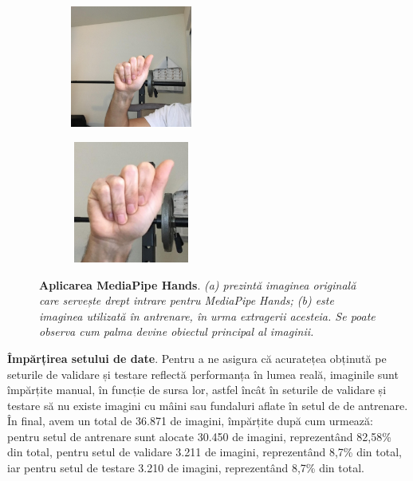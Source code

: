 \begin{figure}[H]
  \centering
  \begin{subfigure}{0.3\textwidth}
  \centering
    \includegraphics[width=4cm,height=4cm,keepaspectratio]
{images/2-recunoasterea-asl/exemple_litera_a/a_before_mediapipe.jpg}
    \caption{}
  \end{subfigure}
  \hspace{0.1\textwidth}
  \begin{subfigure}{0.3\textwidth}
    \centering
    \includegraphics[width=4cm,height=4cm,keepaspectratio]
{images/2-recunoasterea-asl/exemple_litera_a/a_after_mediapipe.jpg}
    \caption{}
  \end{subfigure}
  \caption[Aplicarea MediaPipe Hands]{\textbf{Aplicarea MediaPipe Hands}. \textit{(a) prezintă imaginea originală care servește drept intrare pentru MediaPipe Hands; (b) este imaginea utilizată în antrenare, în urma extragerii acesteia. Se poate observa cum palma devine obiectul principal al imaginii.}}
  \label{fig:before_after_mediapipe}
\end{figure}

\textbf{Împărțirea setului de date}.
Pentru a ne asigura că acuratețea obținută pe seturile de validare și testare reflectă performanța în lumea reală, imaginile sunt împărțite manual, în funcție de sursa lor, astfel încât în seturile de validare și testare să nu existe imagini cu mâini sau fundaluri aflate în setul de de antrenare. În final, avem un total de 36.871 de imagini, împărțite după cum urmează: pentru setul de antrenare sunt alocate 30.450 de imagini, reprezentând 82,58\% din total, pentru setul de validare 3.211 de imagini, reprezentând 8,7\% din total, iar pentru setul de testare 3.210 de imagini, reprezentând 8,7\% din total.

